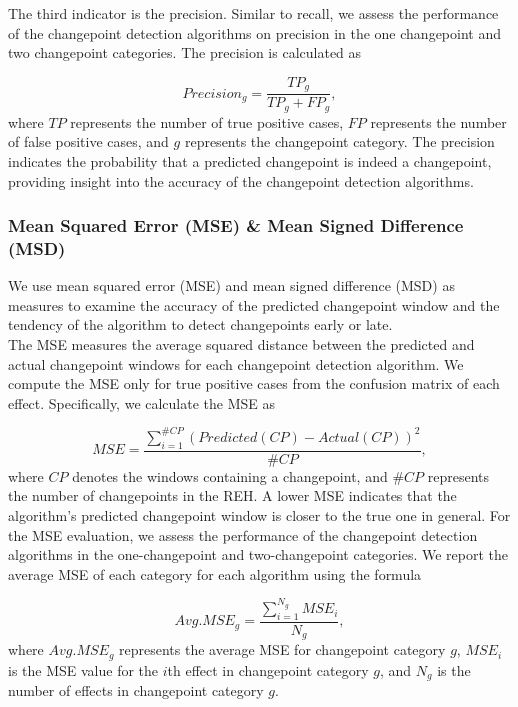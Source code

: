 \documentclass[]{interact}
\theoremstyle{plain}%
\theoremstyle{definition}
\theoremstyle{remark}
\begin{document}
{    The third indicator is the precision. Similar to recall, we assess the performance of the changepoint detection algorithms on precision in the one changepoint and two changepoint categories. The precision is calculated as
 
    \begin{equation} \label{8}
    	Precision_g = \frac{TP_g}{TP_g + FP_g},
    \end{equation}
	where $TP$ represents the number of true positive cases, $FP$ represents the number of false positive cases, and $g$ represents the changepoint category. The precision indicates the probability that a predicted changepoint is indeed a changepoint, providing insight into the accuracy of the changepoint detection algorithms.
	
	\subsubsection{Mean Squared Error (MSE) \& Mean Signed Difference (MSD)} \label{sec:MSE MSD}
	
	\hspace{0.28cm} We use mean squared error (MSE) and mean signed difference (MSD) as measures to examine the accuracy of the predicted changepoint window and the tendency of the algorithm to detect changepoints early or late. \\
	
	The MSE measures the average squared distance between the predicted and actual changepoint windows for each changepoint detection algorithm. We compute the MSE only for true positive cases from the confusion matrix of each effect. Specifically, we calculate the MSE as\cite{aminikhanghahiSurveyMethodsTime2017}
	
	\begin{equation} \label{9}
		MSE = \frac{\sum_{i = 1}^{\#CP} (Predicted(CP) - Actual(CP))^2}{\#CP},
	\end{equation}
	where $CP$ denotes the windows containing a changepoint, and $\#CP$ represents the number of changepoints in the REH. A lower MSE indicates that the algorithm's predicted changepoint window is closer to the true one in general. For the MSE evaluation, we assess the performance of the changepoint detection algorithms in the one-changepoint and two-changepoint categories. We report the average MSE of each category for each algorithm using the formula
	
	\begin{equation} \label{10}
		Avg.MSE_g = \frac{\sum_{i=1}^{N_g} MSE_i}{N_g},
	\end{equation}
	where $Avg.MSE_g$ represents the average MSE for changepoint category $g$, $MSE_i$ is the MSE value for the $i$th effect in changepoint category $g$, and $N_g$ is the number of effects in changepoint category $g$. \\
	
}
\end{document}
